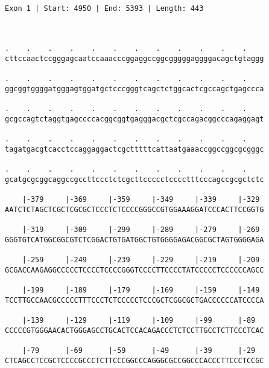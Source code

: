 \documentclass{article}
\begin{document}
 \begin{Verbatim}
 
Exon 1 | Start: 4950 | End: 5393 | Length: 443



.    .    .    .    .    .    .    .    .    .    .    .    
cttccaactccgggagcaatccaaacccggaggccggcgggggaggggacagctgtaggg
                                                            
.    .    .    .    .    .    .    .    .    .    .    .    
ggcggtggggatgggagtggatgctcccgggtcagctctggcactcgccagctgagccca
                                                            
.    .    .    .    .    .    .    .    .    .    .    .    
gcgccagtctaggtgagccccacggcggtgagggacgctcgccagacggcccagaggagt
                                                            
.    .    .    .    .    .    .    .    .    .    .    .    
tagatgacgtcacctccaggaggactcgctttttcattaatgaaaccggccggcgcgggc
                                                            
.    .    .    .    .    .    .    .    .    .    .    .    
gcatgcgcggcaggccgccttccctctcgcttccccctcccctttcccagccgcgctctc
                                                            
    |-379     |-369     |-359     |-349     |-339     |-329 
AATCTCTAGCTCGCTCGCGCTCCCTCTCCCCGGGCCGTGGAAAGGATCCCACTTCCGGTG
                                                            
    |-319     |-309     |-299     |-289     |-279     |-269 
GGGTGTCATGGCGGCGTCTCGGACTGTGATGGCTGTGGGGAGACGGCGCTAGTGGGGAGA
                                                            
    |-259     |-249     |-239     |-229     |-219     |-209 
GCGACCAAGAGGCCCCCTCCCCTCCCCGGGTCCCCTTCCCCTATCCCCCTCCCCCCAGCC
                                                            
    |-199     |-189     |-179     |-169     |-159     |-149 
TCCTTGCCAACGCCCCCTTTCCCTCTCCCCCTCCCGCTCGGCGCTGACCCCCCATCCCCA
                                                            
    |-139     |-129     |-119     |-109     |-99      |-89  
CCCCCGTGGGAACACTGGGAGCCTGCACTCCACAGACCCTCTCCTTGCCTCTTCCCTCAC
                                                            
    |-79      |-69      |-59      |-49      |-39      |-29  
CTCAGCCTCCGCTCCCCGCCCTCTTCCCGGCCCAGGGCGCCGGCCCACCCTTCCCTCCGC
                                                            

\end{Verbatim}
\end{document}
